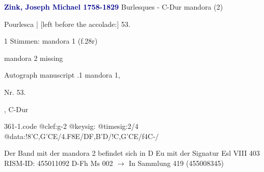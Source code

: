 \documentclass[twocolumn]{book}
\begin{document}
\newline \par \vspace{7pt} \textcolor{darkblue}{\textbf{Zink, Joseph Michael  1758-1829}}
\newline Burlesques - C-Dur
\newline mandora (2)
\newline \begin{itshape}[f.28r, at left:] Pourlesca | [left before the accolade:] 53.\end{itshape} 
\newline \textcolor{darkblue}{}  1 Stimmen: mandora 1  (f.28r)
\newline \begin{small} mandora 2 missing\end{small} 
\newline Autograph manuscript
.1  mandora 1, \begin{itshape}Nr. 53.\end{itshape}, C-Dur  
\begin{filecontents*}{361-1.code}
@clef:g-2
@keysig:
@timesig:2/4
@data:!8'C,G'CE/4.F8E/DF{,B'D}/!C,G'CE/f4C-/
\end{filecontents*}
\newline
%
\newline Der Band mit der mandora 2 befindet sich in D Eu mit der Signatur Esl VIII 403
\newline RISM-ID: 455011092
\newline D-Fh  Ms 002
\newline $\rightarrow$ In Sammlung 419 (455008345)
      
\end{document}
